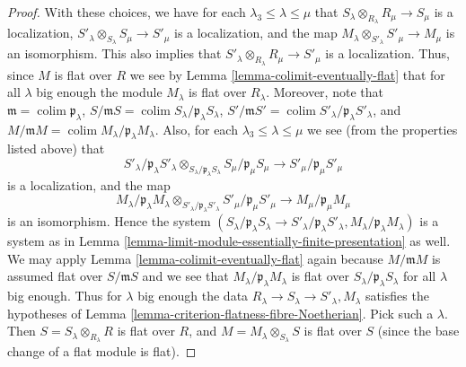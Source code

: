 \documentclass{amsart}
\theoremstyle{plain}
\theoremstyle{definition}
\theoremstyle{remark}
\numberwithin{equation}{subsection}
\def\colim{\mathop{\mathrm{colim}}\nolimits}
\begin{document}
\begin{proof}
\medskip\noindent
With these choices, we have for each $\lambda_3 \leq \lambda \leq \mu$
that $S_\lambda \otimes_{R_{\lambda}} R_\mu \to S_\mu$ is a localization,
$S'_\lambda \otimes_{S_{\lambda}} S_\mu \to S'_\mu$ is a localization, and
the map $M_\lambda \otimes_{S'_\lambda} S'_\mu \to M_\mu$ is an
isomorphism. This also implies that
$S'_\lambda \otimes_{R_{\lambda}} R_\mu \to S'_\mu$ is a localization.
Thus, since $M$ is flat over $R$ we see by
Lemma \ref{lemma-colimit-eventually-flat} that
for all $\lambda$ big enough the module $M_\lambda$ is
flat over $R_\lambda$.
Moreover, note that
$
\mathfrak m = \colim \mathfrak p_\lambda
$,
$
S/\mathfrak mS = \colim S_\lambda/\mathfrak p_\lambda S_\lambda
$,
$
S'/\mathfrak mS' = \colim S'_\lambda/\mathfrak p_\lambda S'_\lambda
$,
and
$
M/\mathfrak mM = \colim M_\lambda/\mathfrak p_\lambda M_\lambda
$. Also, for each $\lambda_3 \leq \lambda \leq \mu$ we see (from the
properties listed above) that
$$
S'_\lambda/\mathfrak p_\lambda S'_\lambda
\otimes_{S_{\lambda}/\mathfrak p_\lambda S_\lambda}
S_\mu/\mathfrak p_\mu S_\mu
\longrightarrow
S'_\mu/\mathfrak p_\mu S'_\mu
$$
is a localization, and the map
$$
M_\lambda / \mathfrak p_\lambda M_\lambda
\otimes_{S'_\lambda/\mathfrak p_\lambda S'_\lambda}
S'_\mu /\mathfrak p_\mu S'_\mu
\longrightarrow
M_\mu/\mathfrak p_\mu M_\mu
$$
is an isomorphism. Hence the system
$(S_\lambda/\mathfrak p_\lambda S_\lambda \to
S'_\lambda/\mathfrak p_\lambda S'_\lambda,
M_\lambda/\mathfrak p_\lambda M_\lambda)$
is a system as in
Lemma \ref{lemma-limit-module-essentially-finite-presentation} as well.
We may apply Lemma \ref{lemma-colimit-eventually-flat} again because
$M/\mathfrak m M$ is assumed flat over $S/\mathfrak mS$ and we see that
$M_\lambda/\mathfrak p_\lambda M_\lambda$ is flat over
$S_\lambda/\mathfrak p_\lambda S_\lambda$ for all $\lambda$ big enough.
Thus for $\lambda$ big enough the data
$R_\lambda \to S_\lambda \to S'_\lambda, M_\lambda$ satisfies
the hypotheses of Lemma \ref{lemma-criterion-flatness-fibre-Noetherian}.
Pick such a $\lambda$. Then $S = S_\lambda \otimes_{R_\lambda} R$
is flat over $R$, and $M = M_\lambda \otimes_{S_\lambda} S$
is flat over $S$ (since the base change of a flat module is flat).
\end{proof}
\end{document}
